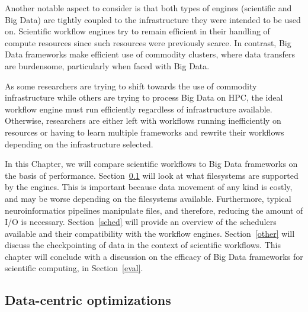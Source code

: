         Another notable aspect to consider is that both types of engines
        (scientific and Big Data) are tightly coupled to the infrastructure they
        were intended to be used on. Scientific workflow engines try to remain
        efficient in their handling of compute resources since such resources
        were previously scarce. In contrast, Big Data frameworks make efficient
        use of commodity clusters, where data transfers are burdensome,
        particularly when faced with Big Data.

        As some researchers are trying to shift towards the use of commodity
        infrastructure while others are trying to process Big Data on HPC, the
        ideal workflow engine must run efficiently regardless of infrastructure
        available. Otherwise, researchers are either left with workflows running
        inefficiently on resources or having to learn multiple frameworks and
        rewrite their workflows depending on the infrastructure selected.
 
        In this Chapter, we will compare scientific workflows to Big Data
        frameworks on the basis of performance. Section~\ref{fs} will look at
        what filesystems are supported by the engines. This is important because
        data movement of any kind is costly, and may be worse depending on the
        filesystems available. Furthermore, typical neuroinformatics pipelines
        manipulate files, and therefore, reducing the amount of I/O is
        necessary. Section~\ref{sched} will provide an overview of the
        schedulers available and their compatibility with the workflow engines.
        Section~\ref{other} will discuss the checkpointing of data in the
        context of scientific workflows. This chapter will conclude with a
        discussion on the efficacy of Big Data frameworks for scientific
        computing, in Section~\ref{eval}.
        
 
        \subsection{Data-centric optimizations}\label{fs}
            

